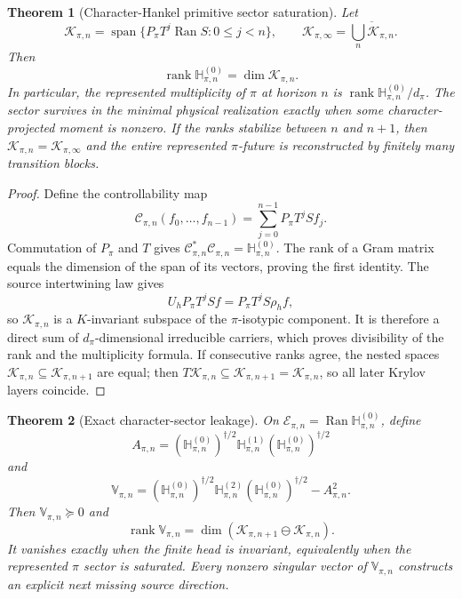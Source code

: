 \documentclass[11pt]{article}
\newtheorem{theorem}{Theorem}[section]
\theoremstyle{definition}
\theoremstyle{remark}
\newcommand{\rank}{\operatorname{rank}}
\newcommand{\Span}{\operatorname{span}}
\newcommand{\Ran}{\operatorname{Ran}}
\begin{document}
\begin{theorem}[Character-Hankel primitive sector saturation]
\label{thm:primitive-sector-saturation}
Let
\[
 \mathcal K_{\pi,n}
 =\Span\{P_\pi T^j\Ran S:0\le j<n\},
 \qquad
 \mathcal K_{\pi,\infty}=\overline{\bigcup_n\mathcal K_{\pi,n}}.
\]
Then
\[
 \boxed{
 \rank\mathbb H_{\pi,n}^{(0)}=\dim\mathcal K_{\pi,n}.}
\]
In particular, the represented multiplicity of $\pi$ at horizon $n$ is
$\rank\mathbb H_{\pi,n}^{(0)}/d_\pi$.  The sector survives in the minimal
physical realization exactly when some character-projected moment is nonzero.
If the ranks stabilize between $n$ and $n+1$, then
$\mathcal K_{\pi,n}=\mathcal K_{\pi,\infty}$ and the entire represented
$\pi$-future is reconstructed by finitely many transition blocks.
\end{theorem}

\begin{proof}
Define the controllability map
\[
 \mathcal C_{\pi,n}(f_0,\ldots,f_{n-1})
 =\sum_{j=0}^{n-1}P_\pi T^jSf_j.
\]
Commutation of $P_\pi$ and $T$ gives
$\mathcal C_{\pi,n}^*\mathcal C_{\pi,n}
=\mathbb H_{\pi,n}^{(0)}$.  The rank of a Gram matrix equals the dimension of
the span of its vectors, proving the first identity.  The source intertwining
law gives
\[
 U_hP_\pi T^jSf=P_\pi T^jS\rho_hf,
\]
so $\mathcal K_{\pi,n}$ is a $K$-invariant subspace of the $\pi$-isotypic
component.  It is therefore a direct sum of $d_\pi$-dimensional irreducible
carriers, which proves divisibility of the rank and the multiplicity formula.  If consecutive ranks agree, the nested spaces
$\mathcal K_{\pi,n}\subseteq\mathcal K_{\pi,n+1}$ are equal; then
$T\mathcal K_{\pi,n}\subseteq\mathcal K_{\pi,n+1}=\mathcal K_{\pi,n}$, so all
later Krylov layers coincide.
\end{proof}

\begin{theorem}[Exact character-sector leakage]
\label{thm:character-leakage-master}
On $\mathcal E_{\pi,n}=\Ran\mathbb H_{\pi,n}^{(0)}$, define
\[
 A_{\pi,n}
 =(\mathbb H_{\pi,n}^{(0)})^{\dagger/2}
   \mathbb H_{\pi,n}^{(1)}
  (\mathbb H_{\pi,n}^{(0)})^{\dagger/2}
\]
and
\[
 \boxed{
 \mathbb V_{\pi,n}
 =(\mathbb H_{\pi,n}^{(0)})^{\dagger/2}
   \mathbb H_{\pi,n}^{(2)}
  (\mathbb H_{\pi,n}^{(0)})^{\dagger/2}
 -A_{\pi,n}^2.}
\]
Then $\mathbb V_{\pi,n}\succeq0$ and
\[
 \boxed{
 \rank\mathbb V_{\pi,n}
 =\dim(\mathcal K_{\pi,n+1}\ominus\mathcal K_{\pi,n}).}
\]
It vanishes exactly when the finite head is invariant, equivalently when the
represented $\pi$ sector is saturated.  Every nonzero singular vector of
$\mathbb V_{\pi,n}$ constructs an explicit next missing source direction.
\end{theorem}
\end{document}
